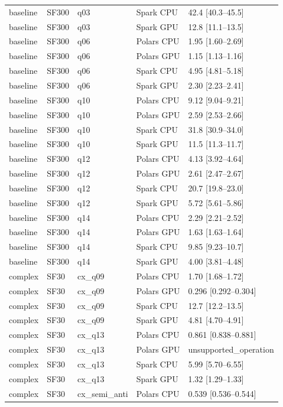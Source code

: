 \begin{longtable}{lllll}
baseline & SF300 & q03 & Spark CPU & 42.4 [40.3--45.5] \\
baseline & SF300 & q03 & Spark GPU & 12.8 [11.1--13.5] \\
baseline & SF300 & q06 & Polars CPU & 1.95 [1.60--2.69] \\
baseline & SF300 & q06 & Polars GPU & 1.15 [1.13--1.16] \\
baseline & SF300 & q06 & Spark CPU & 4.95 [4.81--5.18] \\
baseline & SF300 & q06 & Spark GPU & 2.30 [2.23--2.41] \\
baseline & SF300 & q10 & Polars CPU & 9.12 [9.04--9.21] \\
baseline & SF300 & q10 & Polars GPU & 2.59 [2.53--2.66] \\
baseline & SF300 & q10 & Spark CPU & 31.8 [30.9--34.0] \\
baseline & SF300 & q10 & Spark GPU & 11.5 [11.3--11.7] \\
baseline & SF300 & q12 & Polars CPU & 4.13 [3.92--4.64] \\
baseline & SF300 & q12 & Polars GPU & 2.61 [2.47--2.67] \\
baseline & SF300 & q12 & Spark CPU & 20.7 [19.8--23.0] \\
baseline & SF300 & q12 & Spark GPU & 5.72 [5.61--5.86] \\
baseline & SF300 & q14 & Polars CPU & 2.29 [2.21--2.52] \\
baseline & SF300 & q14 & Polars GPU & 1.63 [1.63--1.64] \\
baseline & SF300 & q14 & Spark CPU & 9.85 [9.23--10.7] \\
baseline & SF300 & q14 & Spark GPU & 4.00 [3.81--4.48] \\
complex & SF30 & cx\_q09 & Polars CPU & 1.70 [1.68--1.72] \\
complex & SF30 & cx\_q09 & Polars GPU & 0.296 [0.292--0.304] \\
complex & SF30 & cx\_q09 & Spark CPU & 12.7 [12.2--13.5] \\
complex & SF30 & cx\_q09 & Spark GPU & 4.81 [4.70--4.91] \\
complex & SF30 & cx\_q13 & Polars CPU & 0.861 [0.838--0.881] \\
complex & SF30 & cx\_q13 & Polars GPU & unsupported\_operation \\
complex & SF30 & cx\_q13 & Spark CPU & 5.99 [5.70--6.55] \\
complex & SF30 & cx\_q13 & Spark GPU & 1.32 [1.29--1.33] \\
complex & SF30 & cx\_semi\_anti & Polars CPU & 0.539 [0.536--0.544] \\

\end{longtable}
